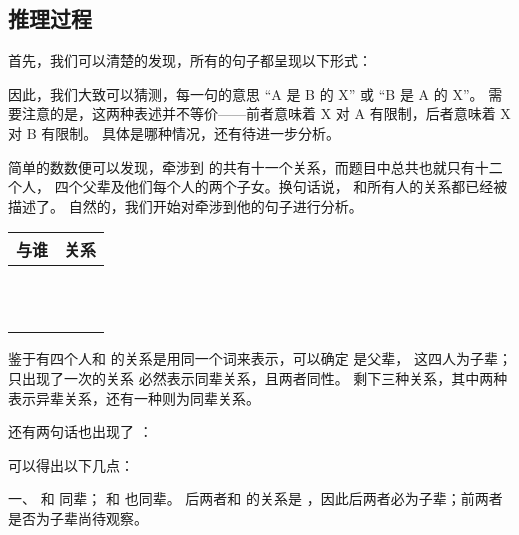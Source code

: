 \subsection{推理过程}

首先，我们可以清楚的发现，所有的句子都呈现以下形式：


因此，我们大致可以猜测，每一句的意思 “A 是 B 的 X” 或 “B 是 A 的 X”。
需要注意的是，这两种表述并不等价——前者意味着 X 对 A 有限制，后者意味着 X 对 B 有限制。
具体是哪种情况，还有待进一步分析。

简单的数数便可以发现，牵涉到 \word{\Hoo} 的共有十一个关系，而题目中总共也就只有十二个人，
四个父辈及他们每个人的两个子女。换句话说，\word{\Hoo} 和所有人的关系都已经被描述了。
自然的，我们开始对牵涉到他的句子进行分析。

\begin{tabular}{l|l}
\hline
\word{\Hoo} 与谁 & 关系 \\
\hline
\word{\Huu} & \word{\tamBr} \\
\word{\Hoowen} & \word{\tangFa} \\
\word{\Hooyon} & \word{\tangFa} \\
\word{\Tee} & \word{\tafBr} \\
\word{\Tii} & \word{\tafBr} \\
\word{\Huuyon} & \word{\tFaBr} \\
\word{\Huuwen} & \word{\tFaBr} \\
\word{\Teeyon} & \word{\tMoBr} \\
\word{\Tiiwen} & \word{\tMoBr} \\
\word{\Teewen} & \word{\tMoBr} \\
\word{\Tiiyon} & \word{\tMoBr} \\
\hline
\end{tabular}

鉴于有四个人和 \word{\Hoo} 的关系是用同一个词来表示，可以确定 \word{\Hoo} 是父辈，
这四人为子辈；只出现了一次的关系 \word{\tamBr} 必然表示同辈关系，且两者同性。
剩下三种关系，其中两种表示异辈关系，还有一种则为同辈关系。

还有两句话也出现了 \word{\tamBr}：

\tangkin{\Huuyon}{\Hooyon}{\tamBr}

\tangkin{\Tiiyon}{\Teeyon}{\tamBr}

可以得出以下几点：

一、\word{\Huuyon} 和 \word{\Hooyon} 同辈；\word{\Tiiyon} 和 \word{\Teeyon} 也同辈。
后两者和 \word{\Hoo} 的关系是 \word{\tMoBr}，因此后两者必为子辈；前两者是否为子辈尚待观察。

